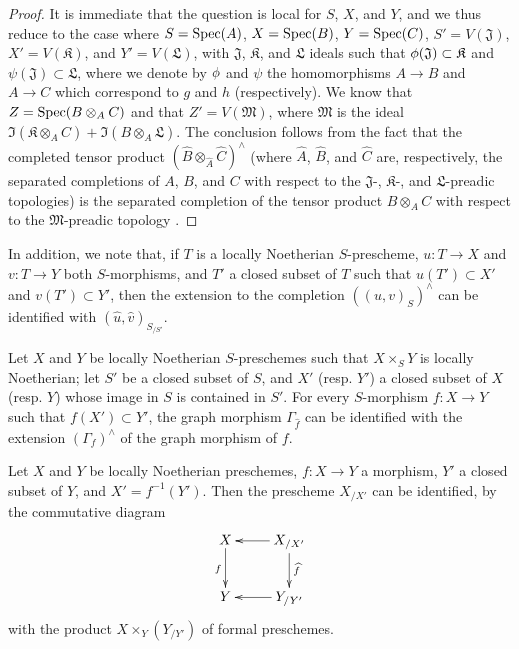 \begin{proof}
\label{proof-1.10.9.7}
It is immediate that the question is local for $S$, $X$, and $Y$, and we thus reduce to the case where $S=\operatorname{Spec}(A)$, $X=\operatorname{Spec}(B)$, $Y=\operatorname{Spec}(C)$, $S'=V(\mathfrak{J})$, $X'=V(\mathfrak{K})$, and $Y'=V(\mathfrak{L})$, with $\mathfrak{J}$, $\mathfrak{K}$, and $\mathfrak{L}$ ideals such that $\phi(\mathfrak{J})\subset\mathfrak{K}$ and $\psi(\mathfrak{J})\subset\mathfrak{L}$, where we denote by $\phi$ and $\psi$ the homomorphisms $A\to B$ and $A\to C$ which correspond to $g$ and $h$ (respectively).
We know that $Z=\operatorname{Spec}(B\otimes_A C)$ and that $Z'=V(\mathfrak{M})$, where $\mathfrak{M}$ is the ideal $\Im(\mathfrak{K}\otimes_A C)+\Im(B\otimes_A\mathfrak{L})$.
The conclusion follows  from the fact that the completed tensor product $(\widehat{B}\otimes_\widehat{A}\widehat{C})^\wedge$ (where $\widehat{A}$, $\widehat{B}$, and $\widehat{C}$ are, respectively, the separated completions of $A$, $B$, and $C$ with respect to the $\mathfrak{J}$-, $\mathfrak{K}$-, and $\mathfrak{L}$-preadic topologies) is the separated completion of the tensor product $B\otimes_A C$ with respect to the $\mathfrak{M}$-preadic topology .
\end{proof}

In addition, we note that, if $T$ is a locally Noetherian $S$-prescheme, $u:T\to X$ and $v:T\to Y$ both $S$-morphisms, and $T'$ a closed subset of $T$ such that $u(T')\subset X'$ and $v(T')\subset Y'$, then the extension to the completion $((u,v)_S)^\wedge$ can be identified with $(\widehat{u},\widehat{v})_{S_{/S'}}$.

\begin{corollary}[10.9.8]
\label{1.10.9.8}
Let $X$ and $Y$ be locally Noetherian $S$-preschemes such that $X\times_S Y$ is locally Noetherian; let $S'$ be a closed subset of $S$, and $X'$ (resp. $Y'$) a closed subset of $X$ (resp. $Y$) whose image in $S$ is contained in $S'$.
For every $S$-morphism $f:X\to Y$ such that $f(X')\subset Y'$, the graph morphism $\Gamma_\widehat{f}$ can be identified with the extension $(\Gamma_f)^\wedge$ of the graph morphism of $f$.
\end{corollary}

\begin{corollary}[10.9.9]
\label{1.10.9.9}
Let $X$ and $Y$ be locally Noetherian preschemes, $f:X\to Y$ a morphism, $Y'$ a closed subset of $Y$, and $X'=f^{-1}(Y')$.
Then the prescheme $X_{/X'}$ can be identified, by the commutative diagram
\[
  \xymatrix{
    X\ar[d]_f &
    X_{/X'}\ar[l]\ar[d]^{\widehat{f}}\\
    Y &
    Y_{/Y'}\ar[l]
  }
\]
with the product $X\times_Y(Y_{/Y'})$ of formal preschemes.
\end{corollary}

